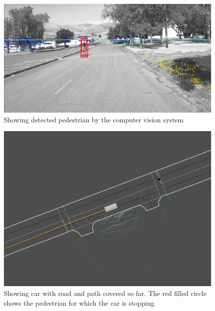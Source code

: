 \documentclass[letterpaper, 10 pt, conference]{ieeeconf}  %
\begin{document}
\begin{figure}[thpb]
  \centering
  \includegraphics[width=1.0\columnwidth]{graphics/ped-detection-screenshot.png}
  \caption{Showing detected pedestrian by the computer vision system}
  \label{fig:ped}
\end{figure}


\begin{figure}[thpb]
  \centering
  \includegraphics[width=1.0\columnwidth]{graphics/screenshot-objectmap.png}
  \caption{Showing car with road and path covered so far. The red filled circle shows the pedestrian for which the car is stopping}
  \label{fig:car}
\end{figure}
\end{document}
